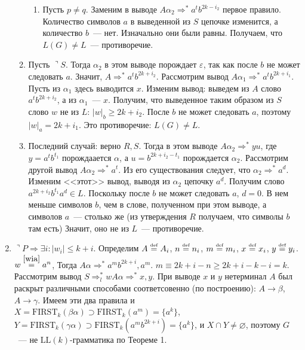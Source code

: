 \documentclass[a4paper]{article}
\def\eqdef{\overset{\mbox{\tiny def}}{=}}
\def\first{\mathrm{ FIRST} }
\def\LL{{\mathrm{LL}}}
\begin{document}
\begin{enumerate}
\begin{enumerate}
\begin{enumerate}
\item Пусть $p\neq q$. Заменим в выводе $A\alpha_2\Rightarrow^* a^tb^{2k-i_2}$ первое правило. Количество символов $a$ в выведенной из $S$ цепочке изменится, а количество $b$~--- нет. Изначально они были равны. Получаем, что $L(G)\neq L$~--- противоречие.
\end{enumerate}
\item Пусть $\urcorner S$. Тогда $\alpha_2$ в этом выводе порождает $\varepsilon$, так как после $b$ не может следовать $a$. Значит, $A\Rightarrow^*a^tb^{2k+i_2}$. Рассмотрим вывод $A\alpha_1\Rightarrow^* a^tb^{2k+i_1}$. Пусть из $\alpha_1$ здесь выводится $x$. Изменим вывод: выведем из $A$ слово $a^tb^{2k+i_2}$, а из $\alpha_1$~--- $x$. Получим, что выведенное таким образом из $S$ слово $w$ не из $L$: $|w|_b\geqslant 2k+i_2$. После $b$ не может следовать $a$, поэтому $|w|_a=2k+i_1$. Это противоречие: $L(G)\neq L$.
\item Последний случай: верно $R, S$. Тогда в этом выводе $A\alpha_2\Rightarrow^* yu$, где $y=a^tb^{t_1}$ порождаается $\alpha$, а $u=b^{2k+i_2-t_1}$ порождается $\alpha_2$. Рассмотрим другой вывод $A\alpha_2\Rightarrow^* a^t$. Из его существования следует, что $\alpha_2\Rightarrow^*a^d$. Изменим <<этот>> вывод, выводя из $\alpha_2$ цепочку $a^d$. Получим слово $a^{2k+i_2}b^{t_1}a^d\in L$. Поскольку после $b$ не может следовать $a$, $d=0$. В нем меньше символов $b$, чем в слове, полученном при этом выводе, а символов $a$~--- столько же (из утверждения $R$ получаем, что символы $b$ там есть) Значит, оно не из $L$~--- противоречие.
\end{enumerate}
\item $\urcorner P\Rightarrow\exists i\colon |w_i|\leqslant k+i$. Определим $A\eqdef A_i$, $n\eqdef n_i$, $m\eqdef m_i$, $x\eqdef x_i$, $y\eqdef y_i$. $w\overset{\ref{wia}}{=}a^n$, Тогда $A\alpha\Rightarrow^* a^{m}b^{2k+i},a^{m}$. $m\equiv 2k+i-n\geqslant 2k+i-k-i=k$. Рассмотрим вывод $S\Rightarrow^*_l wA\alpha\Rightarrow^* x,y$. При выводе $x$ и $y$ нетерминал $A$ был раскрыт различными способами соответсовенно (по построению): $A\to\beta$, $A\to\gamma$. Имеем эти два правила и $X=\first_k(\beta\alpha)\supset \first_k(a^{m})=\{a^k\}$, $Y=\first_k(\gamma\alpha)\supset\first_k(a^{m}b^{2k+i})=\{a^k\}$, и $X\cap Y\neq\varnothing$, поэтому $G$~--- не $\LL(k)$-грамматика по Теореме 1.
\end{enumerate}
\end{document}

